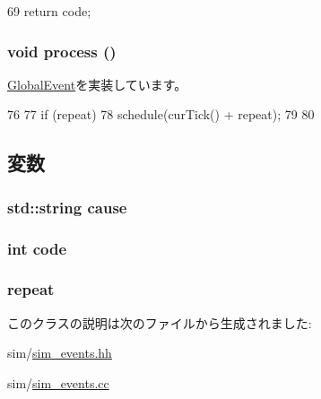 \begin{DoxyCode}
69 { return code; }
\end{DoxyCode}
\hypertarget{classGlobalSimLoopExitEvent_a2e9c5136d19b1a95fc427e0852deab5c}{
\subsubsection[{process}]{\setlength{\rightskip}{0pt plus 5cm}void process ()}}
\label{classGlobalSimLoopExitEvent_a2e9c5136d19b1a95fc427e0852deab5c}


\hyperlink{classGlobalEvent_a142b75b68a6291400e20fb0dd905b1c8}{GlobalEvent}を実装しています。


\begin{DoxyCode}
76 {
77     if (repeat) {
78         schedule(curTick() + repeat);
79     }
80 }
\end{DoxyCode}


\subsection{変数}
\hypertarget{classGlobalSimLoopExitEvent_ae4eec0077e30624726ddd2a0947962e5}{
\subsubsection[{cause}]{\setlength{\rightskip}{0pt plus 5cm}std::string {\bf cause}}}
\label{classGlobalSimLoopExitEvent_ae4eec0077e30624726ddd2a0947962e5}
\hypertarget{classGlobalSimLoopExitEvent_a45a5b7c00a796a23f01673cef1dbe0a9}{
\subsubsection[{code}]{\setlength{\rightskip}{0pt plus 5cm}int {\bf code}}}
\label{classGlobalSimLoopExitEvent_a45a5b7c00a796a23f01673cef1dbe0a9}
\hypertarget{classGlobalSimLoopExitEvent_a186e97c430ff343e8ab14129eaa8375d}{
\subsubsection[{repeat}]{ {\bf repeat}}}
\label{classGlobalSimLoopExitEvent_a186e97c430ff343e8ab14129eaa8375d}


このクラスの説明は次のファイルから生成されました:\begin{DoxyCompactItemize}
\item 
sim/\hyperlink{sim__events_8hh}{sim\_\-events.hh}\item 
sim/\hyperlink{sim__events_8cc}{sim\_\-events.cc}\end{DoxyCompactItemize}
